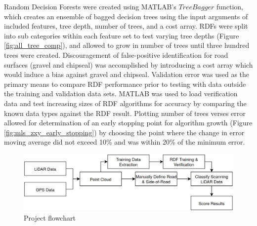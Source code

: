 \documentclass[journal,onecolumn]{IEEEtran}
\begin{document}
	{Random Decision Forests were created using MATLAB's $TreeBagger$ function, which creates an ensemble of bagged decision trees using the input arguments of included features, tree depth, number of trees, and a cost array. RDFs were split into sub categories within each feature set to test varying tree depths (Figure \ref{fig:all_tree_comp}), and allowed to grow in number of trees until three hundred trees were created. Discouragement of false-positive identification for road surfaces (gravel and chipseal) was accomplished by introducing a cost array which would induce a bias against gravel and chipseal. Validation error was used as the primary means to compare RDF performance prior to testing with data outside the training and validation data sets. MATLAB was used to load verification data and test increasing sizes of RDF algorithms for accuracy by comparing the known data types against the RDF result. Plotting number of trees verses error allowed for determination of an early stopping point for algorithm growth (Figure \ref{fig:mls_zxy_early_stopping}) by choosing the point where the change in error moving average did not exceed 10\% and was within 20\% of the minimum error.}
	
	\begin{figure}
		\centering
		\includegraphics[width=0.9\linewidth]{figures/flowz}
		\caption[Project Flow]{Project flowchart}
		\label{fig:flowzchart}
	\end{figure}
	
\end{document}
